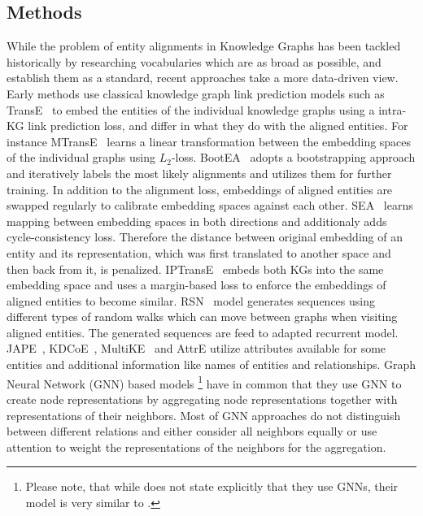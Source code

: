\documentclass[runningheads]{llncs}
\begin{document}
\subsection{Methods}
While the problem of entity alignments in Knowledge Graphs has been tackled historically by researching vocabularies which are as broad as possible, and establish them as a standard, recent approaches take a more data-driven view.
Early methods use classical knowledge graph link prediction models such as TransE~\cite{DBLP:conf/nips/BordesUGWY13} to embed the entities of the individual knowledge graphs using a intra-KG link prediction loss, and differ in what they do with the aligned entities.
For instance MTransE~\cite{DBLP:conf/ijcai/ChenTYZ17} learns a linear transformation between the embedding spaces of the individual graphs using $L_2$-loss.
BootEA~\cite{sun2018bootstrapping} adopts a bootstrapping approach and iteratively labels the most likely alignments and utilizes them for further training. In addition to the alignment loss, embeddings of aligned entities are swapped regularly to calibrate embedding spaces against each other. SEA~\cite{pei2019semi} learns mapping between embedding spaces in both directions and additionaly adds cycle-consistency loss. Therefore the distance between original embedding of an entity and its representation, which was first translated to another space and then back from it, is penalized.
IPTransE~\cite{DBLP:conf/ijcai/ZhuXLS17} embeds both KGs into the same embedding space and uses a margin-based loss to enforce the embeddings of aligned entities to become similar.
RSN~\cite{DBLP:conf/icml/GuoSH19} model generates sequences using different types of random walks which can move between graphs when visiting aligned entities. The generated sequences are feed to adapted recurrent model.
JAPE~\cite{DBLP:conf/semweb/SunHL17}, KDCoE~\cite{DBLP:conf/ijcai/ChenTCSZ18}, MultiKE~\cite{DBLP:conf/ijcai/ZhangSHCGQ19} and AttrE \cite{DBLP:conf/aaai/TrisedyaQZ19} utilize attributes available for some entities and additional information like names of entities and relationships.
Graph Neural Network (GNN) based models
\cite{DBLP:conf/emnlp/WangLLZ18,DBLP:conf/acl/CaoLLLLC19,xu2019cross,DBLP:conf/ijcai/ZhuZ0TG19,anonymous2020deep}\footnote{Please note, that while \cite{DBLP:conf/ijcai/ZhuZ0TG19} does not state explicitly that they use GNNs, their model is very similar to \cite{velivckovic2017graph}.} have in common that they use GNN to create node representations by aggregating node representations together with representations of their neighbors.
Most of GNN approaches do not distinguish between different relations and either consider all neighbors equally \cite{DBLP:conf/emnlp/WangLLZ18,xu2019cross,anonymous2020deep} or use attention \cite{DBLP:conf/acl/CaoLLLLC19} to weight the representations of the neighbors for the aggregation.
\end{document}
